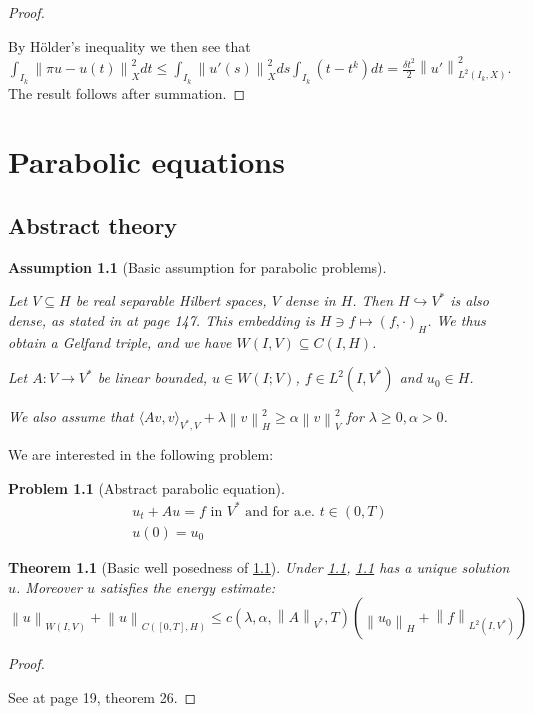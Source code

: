 \documentclass[english,a4paper,9pt,oneside]{scrbook}	%
\theoremstyle{break}
\newtheorem{thm}[equation]{Theorem}
\newtheorem{ass}[equation]{Assumption}
\newtheorem{pb}[equation]{Problem}
\newenvironment{mproof}[1][\proofname]{%
  \begin{proof}[#1]$ $\par\nobreak\ignorespaces
}{%
  \end{proof}
}
\renewcommand*{\proofname}{Proof}
\theoremstyle{remark}
\newcommand{\ds}{\displaystyle}
\newcommand{\norm}[1]{\left\lVert#1\right\rVert}
\newcommand{\HN}[1]{\norm{#1}_{H}}
\newcommand{\VN}[1]{\norm{#1}_{V}}
\newcommand{\VSN}[1]{\norm{#1}_{V^*}}
\begin{document}
\begin{appendices}
\begin{mproof}
By Hölder's inequality we then see that $ \ds \int_{I_k}\norm{\pi u - u(t)}_X^2 dt \leq  \int_{I_k} \norm{u'(s)}_X^2 ds  \int_{I_k}(t-t^k)dt = \frac{\delta t ^2}{2} \norm{u'}_{L^2(I_k,X)}^2$. The result follows after summation.
\end{mproof}

\chapter{Parabolic equations}
\label{chap:parab_eq}

\section{Abstract theory}

\begin{ass}[Basic assumption for parabolic problems]
\label{ass:basic_par}

Let $V\subseteq H$ be real separable Hilbert spaces, $V$ dense in $H$. Then $H\hookrightarrow V^*$ is also dense, as stated in \cite{trol} at page 147. This embedding is $H \ni f \mapsto (f, \cdot )_H$. We thus obtain a Gelfand triple, and we have $W(I,V)\subseteq C(I,H)$.

Let $A:V\rightarrow V^* $ be linear bounded, $u \in W(I;V)$, $f \in L^2(I,V^*)$ and $u_0 \in H$.

We also assume that $\langle Av, v \rangle_{V^*,V}+ \lambda \HN{v}^2\geq \alpha \VN{v}^2$ for $\lambda \geq 0, \alpha >0$.
\end{ass}

We are interested in the following problem:

\begin{pb}[Abstract parabolic equation]
\label{eqn:general_parabolic}
\begin{align}
	u_t+Au=f \text{ in }V^* \text{ and for a.e. } t \in (0,T)\\
	u(0)=u_0
\end{align}
\end{pb}

\begin{thm}[Basic well posedness of \cref{eqn:general_parabolic}]
\label{thm:well_pos_parabolic}
Under \cref{ass:basic_par}, \cref{eqn:general_parabolic} has a unique solution $u$. Moreover $u$ satisfies the energy estimate:
\begin{equation}
	\label{eqn:en_est}
	\norm{u}_{W(I,V)} + \norm{u}_{C([0,T],H)}\leq c(\lambda, \alpha, \VSN{A}, T)(\HN{u_0}+\norm{f}_{L^2(I,V^*)})
\end{equation} 
\end{thm}
\begin{mproof}
See \cite{gilardi} at page 19, theorem 26.
\end{mproof}


\end{appendices}
\end{document}
